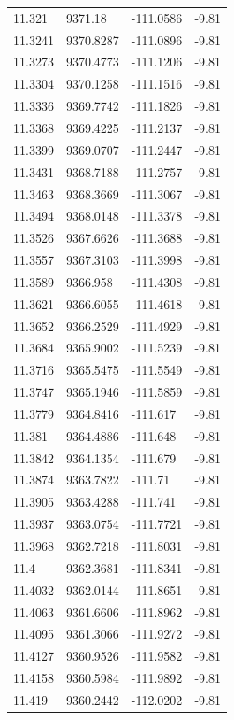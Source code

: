 \begin{table}[H]
\begin{tabular}{llll}
11.321 & 9371.18 & -111.0586 & -9.81 \\
11.3241 & 9370.8287 & -111.0896 & -9.81 \\
11.3273 & 9370.4773 & -111.1206 & -9.81 \\
11.3304 & 9370.1258 & -111.1516 & -9.81 \\
11.3336 & 9369.7742 & -111.1826 & -9.81 \\
11.3368 & 9369.4225 & -111.2137 & -9.81 \\
11.3399 & 9369.0707 & -111.2447 & -9.81 \\
11.3431 & 9368.7188 & -111.2757 & -9.81 \\
11.3463 & 9368.3669 & -111.3067 & -9.81 \\
11.3494 & 9368.0148 & -111.3378 & -9.81 \\
11.3526 & 9367.6626 & -111.3688 & -9.81 \\
11.3557 & 9367.3103 & -111.3998 & -9.81 \\
11.3589 & 9366.958 & -111.4308 & -9.81 \\
11.3621 & 9366.6055 & -111.4618 & -9.81 \\
11.3652 & 9366.2529 & -111.4929 & -9.81 \\
11.3684 & 9365.9002 & -111.5239 & -9.81 \\
11.3716 & 9365.5475 & -111.5549 & -9.81 \\
11.3747 & 9365.1946 & -111.5859 & -9.81 \\
11.3779 & 9364.8416 & -111.617 & -9.81 \\
11.381 & 9364.4886 & -111.648 & -9.81 \\
11.3842 & 9364.1354 & -111.679 & -9.81 \\
11.3874 & 9363.7822 & -111.71 & -9.81 \\
11.3905 & 9363.4288 & -111.741 & -9.81 \\
11.3937 & 9363.0754 & -111.7721 & -9.81 \\
11.3968 & 9362.7218 & -111.8031 & -9.81 \\
11.4 & 9362.3681 & -111.8341 & -9.81 \\
11.4032 & 9362.0144 & -111.8651 & -9.81 \\
11.4063 & 9361.6606 & -111.8962 & -9.81 \\
11.4095 & 9361.3066 & -111.9272 & -9.81 \\
11.4127 & 9360.9526 & -111.9582 & -9.81 \\
11.4158 & 9360.5984 & -111.9892 & -9.81 \\
11.419 & 9360.2442 & -112.0202 & -9.81 \\

\end{tabular}
\end{table}
